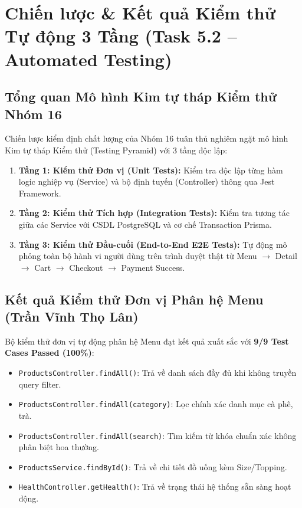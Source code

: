 \documentclass[a4paper]{article}
\begin{document}
\newpage
\section{Chiến lược \& Kết quả Kiểm thử Tự động 3 Tầng (Task 5.2 -- Automated Testing)}

\subsection{Tổng quan Mô hình Kim tự tháp Kiểm thử Nhóm 16}
Chiến lược kiểm định chất lượng của Nhóm 16 tuân thủ nghiêm ngặt mô hình Kim tự tháp Kiểm thử (Testing Pyramid) với 3 tầng độc lập:
\begin{enumerate}
    \item \textbf{Tầng 1: Kiểm thử Đơn vị (Unit Tests):} Kiểm tra độc lập từng hàm logic nghiệp vụ (Service) và bộ định tuyến (Controller) thông qua Jest Framework.
    \item \textbf{Tầng 2: Kiểm thử Tích hợp (Integration Tests):} Kiểm tra tương tác giữa các Service với CSDL PostgreSQL và cơ chế Transaction Prisma.
    \item \textbf{Tầng 3: Kiểm thử Đầu-cuối (End-to-End E2E Tests):} Tự động mô phỏng toàn bộ hành vi người dùng trên trình duyệt thật từ Menu $\rightarrow$ Detail $\rightarrow$ Cart $\rightarrow$ Checkout $\rightarrow$ Payment Success.
\end{enumerate}

\subsection{Kết quả Kiểm thử Đơn vị Phân hệ Menu (Trần Vĩnh Thọ Lân)}
Bộ kiểm thử đơn vị tự động phân hệ Menu đạt kết quả xuất sắc với \textbf{9/9 Test Cases Passed (100\%)}:
\begin{itemize}
    \item \texttt{ProductsController.findAll()}: Trả về danh sách đầy đủ khi không truyền query filter.
    \item \texttt{ProductsController.findAll(category)}: Lọc chính xác danh mục cà phê, trà.
    \item \texttt{ProductsController.findAll(search)}: Tìm kiếm từ khóa chuẩn xác không phân biệt hoa thường.
    \item \texttt{ProductsService.findById()}: Trả về chi tiết đồ uống kèm Size/Topping.
    \item \texttt{HealthController.getHealth()}: Trả về trạng thái hệ thống sẵn sàng hoạt động.
\end{itemize}
\end{document}
